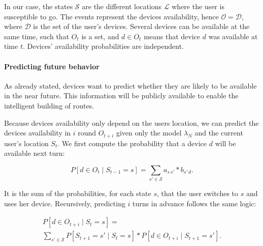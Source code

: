 In our case, the states $\mathcal{S}$ are the different locations $\mathcal{L}$ where the user is susceptible to go.
The events represent the devices availability, hence $\mathcal{O} = \mathcal{D}$, where $\mathcal{D}$ is the set of the user's devices.
Several devices can be available at the same time, such that $O_t$ is a set, and $d \in O_t$ means that device $d$ was available at time $t$. Devices' availability probabilities are independent.




\paragraph*{Predicting future behavior} 
\label{para:predicting future behavior}
As already stated, devices want to predict whether they are likely to be available in the near future.
This information will be publicly available to enable the intelligent building of routes.

Because devices availability only depend on the users location, we can predict the devices availability in $i$ round $O_{t+i}$ given only the model $\lambda_N$ and the current user's location $S_t$. We first compute the probability that a device $d$ will be available next turn:

$$
P\left[ d \in O_{t} \mid S_{t-1} = s \right] = 
\sum\limits_{s' \in \mathcal{S}} 
a_{s\,s'} * b_{s'\,d}.
$$

It is the sum of the probabilities, for each state $s$, that the user switches to $s$ and uses her device.
Recursively, predicting $i$ turns in advance follows the same logic:

\begin{multline*}
P\left[ d \in O_{t+i} \mid S_{t} = s \right] = \\
\sum\limits_{s' \in \mathcal{S}}
P\left[ S_{t+1} = s' \mid S_t = s \right] * 
P\left[ d \in O_{t+i} \mid S_{t+1} = s'\right].
\end{multline*}

